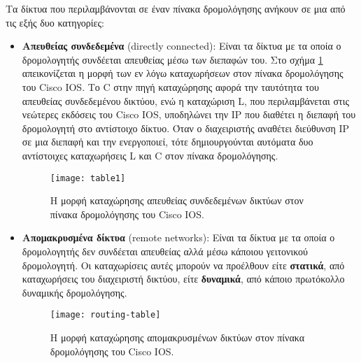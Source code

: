 \documentclass{EdipyLabs} %
\begin{document}
Τα δίκτυα που περιλαμβάνονται σε έναν πίνακα δρομολόγησης ανήκουν σε μια από τις εξής δυο κατηγορίες:
\begin{itemize}
	\item \textbf{Απευθείας συνδεδεμένα} (directly connected): Είναι τα δίκτυα με τα οποία ο δρομολογητής συνδέεται απευθείας μέσω των διεπαφών του. Στο σχήμα \ref{fig:table1} απεικονίζεται η μορφή των εν λόγω καταχωρήσεων στον πίνακα δρομολόγησης του Cisco IOS. Το C στην πηγή καταχώρησης αφορά την ταυτότητα του απευθείας συνδεδεμένου δικτύου, ενώ η καταχώριση L, που περιλαμβάνεται στις νεώτερες εκδόσεις του Cisco IOS, υποδηλώνει την IP που διαθέτει η διεπαφή του δρομολογητή στο αντίστοιχο δίκτυο. Όταν ο διαχειριστής αναθέτει διεύθυνση IP σε μια διεπαφή και την ενεργοποιεί, τότε δημιουργούνται αυτόματα δυο αντίστοιχες καταχωρήσεις L και C στον πίνακα δρομολόγησης.
	
	\begin{figure}[ht]
		\texttt{[image: table1]}
		\caption{H μορφή καταχώρησης απευθείας συνδεδεμένων δικτύων στον πίνακα δρομολόγησης του Cisco IOS.}\label{fig:table1}
	\end{figure}
	
	\item \textbf{Απομακρυσμένα δίκτυα} (remote networks): Είναι τα δίκτυα με τα οποία ο δρομολογητής δεν συνδέεται απευθείας αλλά μέσω κάποιου γειτονικού δρομολογητή. Οι καταχωρίσεις αυτές μπορούν να προέλθουν είτε \textbf{στατικά}, από καταχωρήσεις του διαχειριστή δικτύου, είτε \textbf{δυναμικά}, από κάποιο πρωτόκολλο δυναμικής δρομολόγησης.
	
	\begin{figure}[ht]
		\texttt{[image: routing-table]}
		\caption{H μορφή καταχώρησης απομακρυσμένων δικτύων στον πίνακα δρομολόγησης του Cisco IOS.}\label{fig:routing-table}
	\end{figure}
	

\end{itemize}
\end{document}
